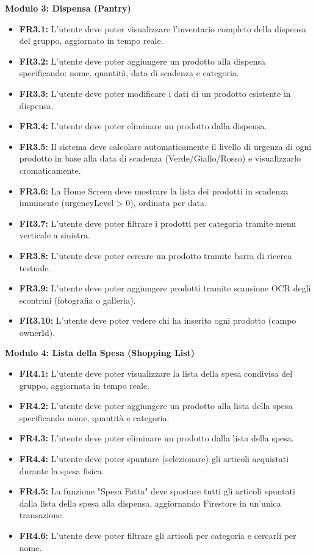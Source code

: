\documentclass[12pt,a4paper]{article}
\begin{document}
\textbf{Modulo 3: Dispensa (Pantry)}
\begin{itemize}
    \item \textbf{FR3.1:} L'utente deve poter visualizzare l'inventario completo della dispensa del gruppo, aggiornato in tempo reale.
    \item \textbf{FR3.2:} L'utente deve poter aggiungere un prodotto alla dispensa specificando: nome, quantità, data di scadenza e categoria.
    \item \textbf{FR3.3:} L'utente deve poter modificare i dati di un prodotto esistente in dispensa.
    \item \textbf{FR3.4:} L'utente deve poter eliminare un prodotto dalla dispensa.
    \item \textbf{FR3.5:} Il sistema deve calcolare automaticamente il livello di urgenza di ogni prodotto in base alla data di scadenza (Verde/Giallo/Rosso) e visualizzarlo cromaticamente.
    \item \textbf{FR3.6:} La Home Screen deve mostrare la lista dei prodotti in scadenza imminente (urgencyLevel > 0), ordinata per data.
    \item \textbf{FR3.7:} L'utente deve poter filtrare i prodotti per categoria tramite menu verticale a sinistra.
    \item \textbf{FR3.8:} L'utente deve poter cercare un prodotto tramite barra di ricerca testuale.
    \item \textbf{FR3.9:} L'utente deve poter aggiungere prodotti tramite scansione OCR degli scontrini (fotografia o galleria).
    \item \textbf{FR3.10:} L'utente deve poter vedere chi ha inserito ogni prodotto (campo ownerId).
\end{itemize}

\textbf{Modulo 4: Lista della Spesa (Shopping List)}
\begin{itemize}
    \item \textbf{FR4.1:} L'utente deve poter visualizzare la lista della spesa condivisa del gruppo, aggiornata in tempo reale.
    \item \textbf{FR4.2:} L'utente deve poter aggiungere un prodotto alla lista della spesa specificando nome, quantità e categoria.
    \item \textbf{FR4.3:} L'utente deve poter eliminare un prodotto dalla lista della spesa.
    \item \textbf{FR4.4:} L'utente deve poter spuntare (selezionare) gli articoli acquistati durante la spesa fisica.
    \item \textbf{FR4.5:} La funzione "Spesa Fatta" deve spostare tutti gli articoli spuntati dalla lista della spesa alla dispensa, aggiornando Firestore in un'unica transazione.
    \item \textbf{FR4.6:} L'utente deve poter filtrare gli articoli per categoria e cercarli per nome.
\end{itemize}
\end{document}
